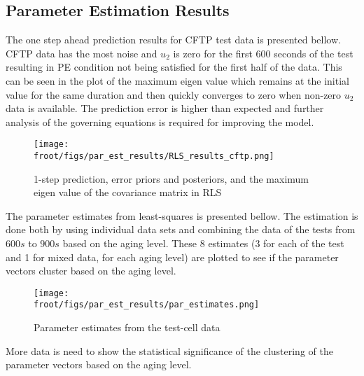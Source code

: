 \subsection{Parameter Estimation Results}
The one step ahead prediction results for CFTP test data is presented bellow. CFTP data has the most noise and $u_2$ is zero for the first 600 seconds of the test resulting in PE condition not being satisfied for the first half of the data. This can be seen in the plot of the maximum eigen value which remains at the initial value for the same duration and then quickly converges to zero when non-zero $u_2$ data is available. The prediction error is higher than expected and further analysis of the governing equations is required for improving the model.
\begin{figure}[H]
        \centering
        \texttt{[image: \\froot/figs/par\_est\_results/RLS\_results\_cftp.png]}
        \caption{1-step prediction, error priors and posteriors, and the maximum eigen value of the covariance matrix in RLS}
\end{figure}
The parameter estimates from least-squares is presented bellow. The estimation is done both by using individual data sets and combining the data of the tests from $600 s$ to $900 s$ based on the aging level. These 8 estimates (3 for each of the test and 1 for mixed data, for each aging level) are plotted to see if the parameter vectors cluster based on the aging level.
\begin{figure}[H]
        \centering
        \texttt{[image: \\froot/figs/par\_est\_results/par\_estimates.png]}
        \caption{Parameter estimates from the test-cell data}
\end{figure}
More data is need to show the statistical significance of the clustering of the parameter vectors based on the aging level.
